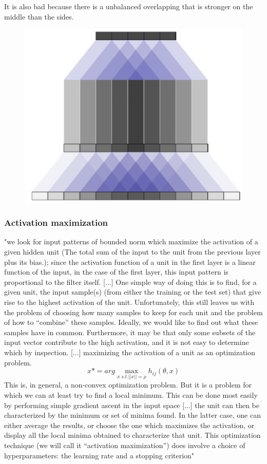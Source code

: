 		It is also bad because there is a unbalanced overlapping that is stronger on the middle than the sides.
		\begin{figure}
		\centering
		\includegraphics[width=0.7\linewidth]{Figures/overlapping}
		\caption{}
		\label{fig:overlapping}
		\end{figure}
			
		\subsubsection{Activation maximization}
		"we look for input patterns of bounded norm which maximize the activation of a given hidden unit (The total sum of the input to the unit from the previous layer plus its bias.); since the activation function of a unit in the first layer is a linear function of the input, in the case of the first layer, this input pattern is proportional to the filter itself. [...] 
		One simple way of doing this is to find, for a given unit, the input sample(s) (from either the training or the test set) that give rise to the highest activation of the unit. Unfortunately, this still leaves us with the problem of choosing how many samples to keep for each unit and the problem of how to “combine” these samples. Ideally, we would like to find out what these samples have in common. Furthermore, it may be that only some subsets of the input vector contribute to the high activation, and it is not easy to determine which by inspection.
		[...]
		maximizing the activation of a unit as an optimization problem.
		\begin{equation}
		x* = arg \max\limits_{x \; s.t. ||x||=\rho} h_{ij}(\theta,x)
		\end{equation}
		This is, in general, a non-convex optimization problem. But it is a problem for which we can at least try to find a local minimum. This can be done most easily by performing simple gradient ascent in the input space [...] 
		the unit can then be characterized by the minimum or set of minima found. In the latter case, one can either average the results, or choose the one which maximizes the activation, or display all the local minima obtained to characterize that unit.
		This optimization technique (we will call it “activation maximization”) does involve a choice of hyperparameters: the learning rate and a stopping criterion" \cite{Erhan2009}
		
